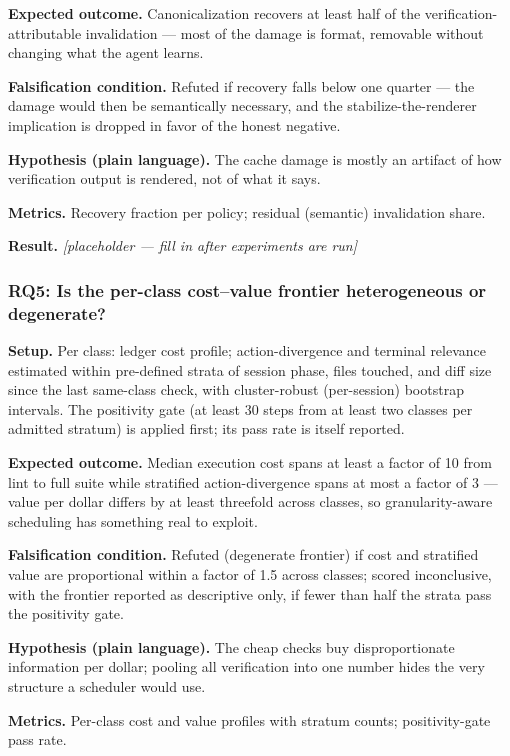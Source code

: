 \documentclass[11pt]{article}
\newcommand{\ph}{\textit{[placeholder --- fill in after experiments are run]}}
\begin{document}
\textbf{Expected outcome.} Canonicalization recovers at least half of the verification-attributable invalidation --- most of the damage is format, removable without changing what the agent learns.

\textbf{Falsification condition.} Refuted if recovery falls below one quarter --- the damage would then be semantically necessary, and the stabilize-the-renderer implication is dropped in favor of the honest negative.

\textbf{Hypothesis (plain language).} The cache damage is mostly an artifact of how verification output is rendered, not of what it says.

\textbf{Metrics.} Recovery fraction per policy; residual (semantic) invalidation share.

\textbf{Result.} \ph

\subsubsection{RQ5: Is the per-class cost--value frontier heterogeneous or degenerate?}

\textbf{Setup.} Per class: ledger cost profile; action-divergence and terminal relevance estimated within pre-defined strata of session phase, files touched, and diff size since the last same-class check, with cluster-robust (per-session) bootstrap intervals. The positivity gate (at least 30 steps from at least two classes per admitted stratum) is applied first; its pass rate is itself reported.

\textbf{Expected outcome.} Median execution cost spans at least a factor of 10 from lint to full suite while stratified action-divergence spans at most a factor of 3 --- value per dollar differs by at least threefold across classes, so granularity-aware scheduling has something real to exploit.

\textbf{Falsification condition.} Refuted (degenerate frontier) if cost and stratified value are proportional within a factor of 1.5 across classes; scored inconclusive, with the frontier reported as descriptive only, if fewer than half the strata pass the positivity gate.

\textbf{Hypothesis (plain language).} The cheap checks buy disproportionate information per dollar; pooling all verification into one number hides the very structure a scheduler would use.

\textbf{Metrics.} Per-class cost and value profiles with stratum counts; positivity-gate pass rate.
\end{document}
